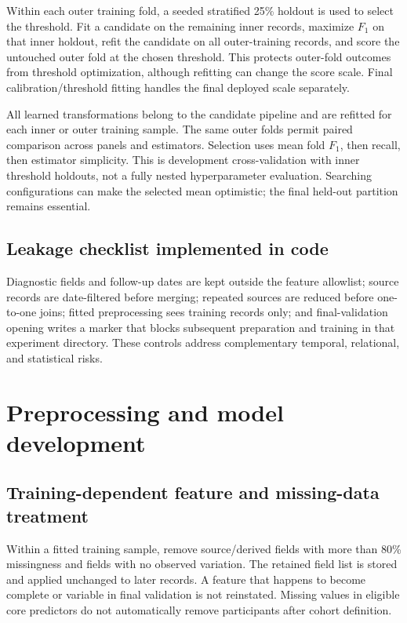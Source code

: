\documentclass[11pt,a4paper]{article}
\begin{document}
Within each outer training fold, a seeded stratified 25\% holdout is used to select the threshold. Fit a candidate on the remaining inner records, maximize $F_1$ on that inner holdout, refit the candidate on all outer-training records, and score the untouched outer fold at the chosen threshold. This protects outer-fold outcomes from threshold optimization, although refitting can change the score scale. Final calibration/threshold fitting handles the final deployed scale separately.

All learned transformations belong to the candidate pipeline and are refitted for each inner or outer training sample. The same outer folds permit paired comparison across panels and estimators. Selection uses mean fold $F_1$, then recall, then estimator simplicity. This is development cross-validation with inner threshold holdouts, not a fully nested hyperparameter evaluation. Searching configurations can make the selected mean optimistic; the final held-out partition remains essential.
\subsection{Leakage checklist implemented in code}
Diagnostic fields and follow-up dates are kept outside the feature allowlist; source records are date-filtered before merging; repeated sources are reduced before one-to-one joins; fitted preprocessing sees training records only; and final-validation opening writes a marker that blocks subsequent preparation and training in that experiment directory. These controls address complementary temporal, relational, and statistical risks.

\clearpage
\section{Preprocessing and model development}
\subsection{Training-dependent feature and missing-data treatment}
Within a fitted training sample, remove source/derived fields with more than 80\% missingness and fields with no observed variation. The retained field list is stored and applied unchanged to later records. A feature that happens to become complete or variable in final validation is not reinstated. Missing values in eligible core predictors do not automatically remove participants after cohort definition.
\end{document}

